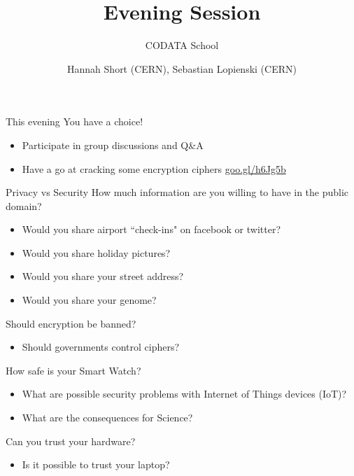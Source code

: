 \documentclass{beamer}
\author{Hannah Short (CERN), Sebastian Lopienski (CERN)}
\title{Evening Session}
\subtitle{CODATA School}
\begin{document}
\frontcover

\frame{\titlepage}


\begin{frame}{This evening}
You have a choice!
\begin{itemize}
\item Participate in group discussions and Q\&A
\item Have a go at cracking some encryption ciphers \url{goo.gl/h6Jg5b}
\end{itemize}
\end{frame}

\begin{frame}{Privacy vs Security}
How much information are you willing to have in the public domain?
\begin{itemize}
\item Would you share airport ``check-ins" on facebook or twitter?
\item Would you share holiday pictures?
\item Would you share your street address?
\item Would you share your genome?
\end{itemize}
\end{frame}

\begin{frame}{Should encryption be banned?}
\begin{itemize}
\item Should governments control ciphers?
\end{itemize}
\end{frame}

\begin{frame}{How safe is your Smart Watch?}
\begin{itemize}
\item What are possible security problems with Internet of Things devices (IoT)?
\item What are the consequences for Science?
\end{itemize} 
\end{frame}

\begin{frame}{Can you trust your hardware?}
\begin{itemize}
\item Is it possible to trust your laptop?
\end{itemize}
\end{frame}
\end{document}
